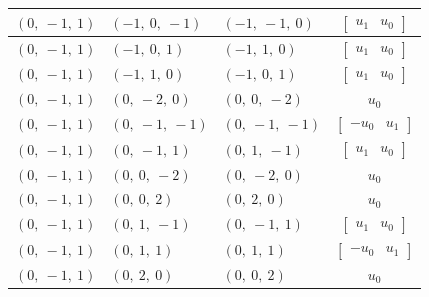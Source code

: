 \documentclass[11pt]{article}
\theoremstyle{definition}
\begin{document}
\begin{longtable}{|l|l|l|c|}
    \hline
    $\left( 0, \  -1, \  1\right)$ & $\left( -1, \  0, \  -1\right)$ & $\left( -1, \  -1, \  0\right)$ & $\left[\begin{matrix}u_{1} & u_{0}\end{matrix}\right]$ \\
    \hline
    $\left( 0, \  -1, \  1\right)$ & $\left( -1, \  0, \  1\right)$ & $\left( -1, \  1, \  0\right)$ & $\left[\begin{matrix}u_{1} & u_{0}\end{matrix}\right]$ \\
    \hline
    $\left( 0, \  -1, \  1\right)$ & $\left( -1, \  1, \  0\right)$ & $\left( -1, \  0, \  1\right)$ & $\left[\begin{matrix}u_{1} & u_{0}\end{matrix}\right]$ \\
    \hline
    $\left( 0, \  -1, \  1\right)$ & $\left( 0, \  -2, \  0\right)$ & $\left( 0, \  0, \  -2\right)$ & $u_{0}$ \\
    \hline
    $\left( 0, \  -1, \  1\right)$ & $\left( 0, \  -1, \  -1\right)$ & $\left( 0, \  -1, \  -1\right)$ & $\left[\begin{matrix}- u_{0} & u_{1}\end{matrix}\right]$ \\
    \hline
    $\left( 0, \  -1, \  1\right)$ & $\left( 0, \  -1, \  1\right)$ & $\left( 0, \  1, \  -1\right)$ & $\left[\begin{matrix}u_{1} & u_{0}\end{matrix}\right]$ \\
    \hline
    $\left( 0, \  -1, \  1\right)$ & $\left( 0, \  0, \  -2\right)$ & $\left( 0, \  -2, \  0\right)$ & $u_{0}$ \\
    \hline
    $\left( 0, \  -1, \  1\right)$ & $\left( 0, \  0, \  2\right)$ & $\left( 0, \  2, \  0\right)$ & $u_{0}$ \\
    \hline
    $\left( 0, \  -1, \  1\right)$ & $\left( 0, \  1, \  -1\right)$ & $\left( 0, \  -1, \  1\right)$ & $\left[\begin{matrix}u_{1} & u_{0}\end{matrix}\right]$ \\
    \hline
    $\left( 0, \  -1, \  1\right)$ & $\left( 0, \  1, \  1\right)$ & $\left( 0, \  1, \  1\right)$ & $\left[\begin{matrix}- u_{0} & u_{1}\end{matrix}\right]$ \\
    \hline
    $\left( 0, \  -1, \  1\right)$ & $\left( 0, \  2, \  0\right)$ & $\left( 0, \  0, \  2\right)$ & $u_{0}$ \\

\end{longtable}
\end{document}
